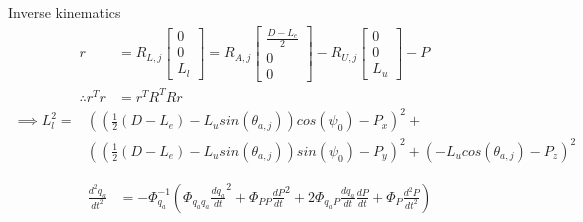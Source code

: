 Inverse kinematics
\begin{equation}
    \begin{aligned}
    r&= R_{L,j}\begin{bmatrix}0\\0\\L_l \end{bmatrix} = R_{A,j}\begin{bmatrix}\frac{D-L_e}{2}\\0\\0 \end{bmatrix} - R_{U,j}\begin{bmatrix}0\\0\\L_u  \end{bmatrix} - P  \\
\therefore    r^Tr&=r^TR^TRr &
    \end{aligned}
\end{equation}
\begin{equation}
\begin{split}
\implies L_l^2 =&\left(\left(\tfrac{1}{2}(D-L_e)-L_u sin(\theta_{a,j})\right)cos(\psi_0) -P_x\right)^2+ \\       &\left(\left(\tfrac{1}{2}(D-L_e)-L_usin(\theta_{a,j})\right)sin(\psi_0)-P_y\right)^2+(-L_ucos(\theta_{a,j})-P_z)^2
\end{split}
\end{equation}

\begin{equation}
\begin{aligned}
\tfrac{d^2q_a}{dt^2}&=-\Phi_{q_a}^{-1} (\Phi_{q_aq_a}\tfrac{dq_a}{dt}^2+\Phi_{PP}\tfrac{dP}{dt}^2+2\Phi_{q_aP}\tfrac{dq_a}{dt}\tfrac{dP}{dt}+\Phi_P\tfrac{d^2P}{dt^2}) 
\end{aligned}
\end{equation}

